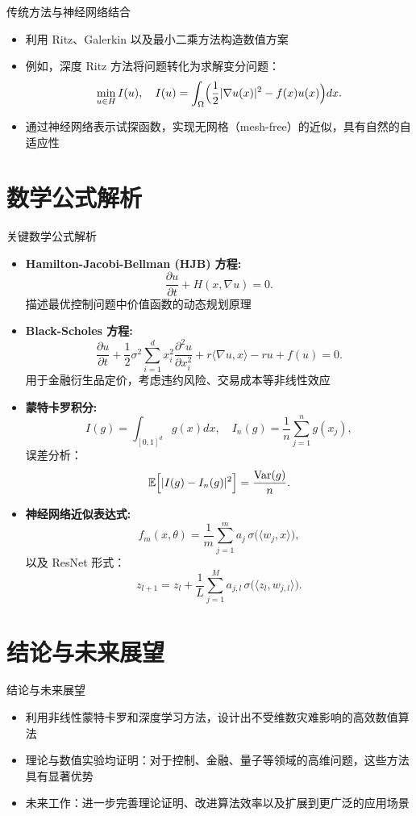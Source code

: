 \documentclass[aspectratio=169]{beamer}
\begin{document}
\begin{frame}{传统方法与神经网络结合}
  \begin{itemize}
    \item 利用 Ritz、Galerkin 以及最小二乘方法构造数值方案
    \item 例如，深度 Ritz 方法将问题转化为求解变分问题：
      \[
      \min_{u\in H} I(u),\quad I(u)=\int_\Omega \Bigl(\frac{1}{2}|\nabla u(x)|^2 - f(x)u(x)\Bigr)dx.
      \]
    \item 通过神经网络表示试探函数，实现无网格（mesh-free）的近似，具有自然的自适应性
  \end{itemize}
\end{frame}

\section{数学公式解析}
\begin{frame}{关键数学公式解析}
  \begin{itemize}
    \item \textbf{Hamilton-Jacobi-Bellman (HJB) 方程:}
      \[
      \frac{\partial u}{\partial t}+H(x,\nabla u)=0.
      \]
      描述最优控制问题中价值函数的动态规划原理
    \item \textbf{Black-Scholes 方程:}
      \[
      \frac{\partial u}{\partial t}+\frac{1}{2}\sigma^2 \sum_{i=1}^{d}x_i^2 \frac{\partial^2 u}{\partial x_i^2}+r\langle \nabla u,x\rangle-ru+f(u)=0.
      \]
      用于金融衍生品定价，考虑违约风险、交易成本等非线性效应
    \item \textbf{蒙特卡罗积分:}
      \[
      I(g)=\int_{[0,1]^d}g(x)dx,\quad I_n(g)=\frac{1}{n}\sum_{j=1}^n g(x_j),
      \]
      误差分析：
      \[
      \mathbb{E}\Bigl[|I(g)-I_n(g)|^2\Bigr]=\frac{\mathrm{Var}(g)}{n}.
      \]
    \item \textbf{神经网络近似表达式:}
      \[
      f_m(x,\theta)=\frac{1}{m}\sum_{j=1}^{m}a_j\,\sigma\bigl(\langle w_j,x\rangle\bigr),
      \]
      以及 ResNet 形式：
      \[
      z_{l+1}=z_l+\frac{1}{L}\sum_{j=1}^{M}a_{j,l}\,\sigma\bigl(\langle z_l,w_{j,l}\rangle\bigr).
      \]
  \end{itemize}
\end{frame}

\section{结论与未来展望}
\begin{frame}{结论与未来展望}
  \begin{itemize}
    \item 利用非线性蒙特卡罗和深度学习方法，设计出不受维数灾难影响的高效数值算法
    \item 理论与数值实验均证明：对于控制、金融、量子等领域的高维问题，这些方法具有显著优势
    \item 未来工作：进一步完善理论证明、改进算法效率以及扩展到更广泛的应用场景
  \end{itemize}
\end{frame}
\end{document}
